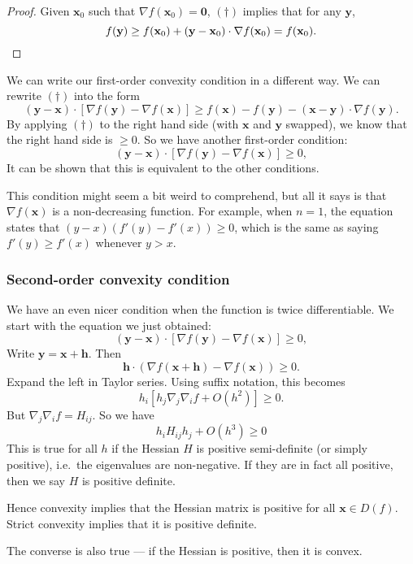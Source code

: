 \documentclass[a4paper]{article}
\begin{document}
\begin{proof}
  Given $\mathbf{x}_0$ such that $\nabla f(\mathbf{x}_0) = \mathbf{0}$, $(\dagger)$ implies that for any $\mathbf{y}$,
  \[
    f(\mathbf{y}) \geq f(\mathbf{x}_0) + (\mathbf{y} - \mathbf{x}_0)\cdot \nabla f(\mathbf{x}_0) = f(\mathbf{x}_0). \qedhere
  \]
\end{proof}
We can write our first-order convexity condition in a different way. We can rewrite $(\dagger)$ into the form
\[
  (\mathbf{y} - \mathbf{x}) \cdot [\nabla f(\mathbf{y}) - \nabla f(\mathbf{x})] \geq f(\mathbf{x}) - f(\mathbf{y}) - (\mathbf{x} - \mathbf{y}) \cdot \nabla f(\mathbf{y}).
\]
By applying $(\dagger)$ to the right hand side (with $\mathbf{x}$ and $\mathbf{y}$ swapped), we know that the right hand side is $\geq 0$. So we have another first-order condition:
\[
  (\mathbf{y} - \mathbf{x})\cdot [\nabla f(\mathbf{y}) - \nabla f(\mathbf{x})] \geq 0,
\]
It can be shown that this is equivalent to the other conditions.

This condition might seem a bit weird to comprehend, but all it says is that $\nabla f(\mathbf{x})$ is a non-decreasing function. For example, when $n = 1$, the equation states that $(y - x)(f'(y) - f'(x)) \geq 0$, which is the same as saying $f'(y) \geq f'(x)$ whenever $y > x$.

\subsubsection{Second-order convexity condition}
We have an even nicer condition when the function is twice differentiable. We start with the equation we just obtained:
\[
  (\mathbf{y} - \mathbf{x})\cdot [\nabla f(\mathbf{y}) - \nabla f(\mathbf{x})] \geq 0,
\]
Write $\mathbf{y} = \mathbf{x} + \mathbf{h}$. Then
\[
  \mathbf{h} \cdot (\nabla f(\mathbf{x} + \mathbf{h}) - \nabla f(\mathbf{x})) \geq 0.
\]
Expand the left in Taylor series. Using suffix notation, this becomes
\[
  h_i [h_j \nabla_j \nabla_i f + O(h^2)] \geq 0.
\]
But $\nabla_j \nabla_i f = H_{ij}$. So we have
\[
  h_i H_{ij}h_j + O(h^3) \geq 0
\]
This is true for all $h$ if the Hessian $H$ is positive semi-definite (or simply positive), i.e.\ the eigenvalues are non-negative. If they are in fact all positive, then we say $H$ is positive definite.

Hence convexity implies that the Hessian matrix is positive for all $\mathbf{x}\in D(f)$. Strict convexity implies that it is positive definite.

The converse is also true --- if the Hessian is positive, then it is convex.
\end{document}
